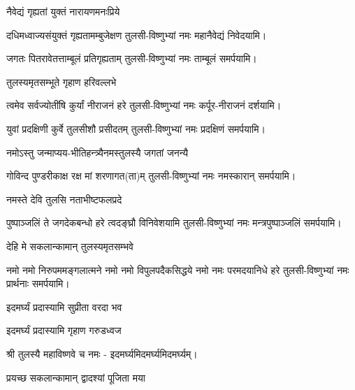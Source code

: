 {नैवेद्यं गृह्यतां युक्तं नारायणमनःप्रिये}

{दधिमध्वाज्यसंयुक्तं गृह्यतामम्बुजेक्षण}
\hfill{}तुलसी-विष्णुभ्यां नमः महानैवेद्यं निवेदयामि।

{जगतः पितरावेतत्ताम्बूलं प्रतिगृह्यताम्}
\hfill{}तुलसी-विष्णुभ्यां नमः ताम्बूलं समर्पयामि।

{तुलस्यमृतसम्भूते गृहाण हरिवल्लभे}

{त्वमेव सर्वज्योतींषि कुर्यां नीराजनं हरे}
\hfill{}तुलसी-विष्णुभ्यां नमः कर्पूर-नीराजनं दर्शयामि।

{युवां प्रदक्षिणी कुर्वे तुलसीशौ प्रसीदतम्}
\hfill{}तुलसी-विष्णुभ्यां नमः प्रदक्षिणं समर्पयामि।

{नमोऽस्तु जन्माप्यय-भीतिहन्त्र्यै}{नमस्तुलस्यै जगतां जनन्यै}

{गोविन्द पुण्डरीकाक्ष रक्ष मां शरणागत(ता)म्}
\hfill{}तुलसी-विष्णुभ्यां नमः नमस्कारान् समर्पयामि।

{नमस्ते देवि तुलसि नताभीष्टफलप्रदे}

{पुष्पाञ्जलिं ते जगदेकबन्धो हरे त्वदङ्घ्रौ विनिवेशयामि}
\hfill{}तुलसी-विष्णुभ्यां नमः मन्त्रपुष्पाञ्जलिं समर्पयामि।

{देहि मे सकलान्कामान् तुलस्यमृतसम्भवे}

{नमो नमो निरुपममङ्गलात्मने}
{नमो नमो विपुलपदैकसिद्धये}
{नमो नमः परमदयानिधे हरे}
\nopagebreak[4]\hfill{}तुलसी-विष्णुभ्यां नमः प्रार्थनाः समर्पयामि।

{इदमर्घ्यं प्रदास्यामि सुप्रीता वरदा भव}

{इदमर्घ्यं प्रदास्यामि गृहाण गरुडध्वज}

श्री तुलस्यै महाविष्णवे च नमः - इदमर्घ्यमिदमर्घ्यमिदमर्घ्यम्।

{प्रयच्छ सकलान्कामान् द्वादश्यां पूजिता मया}


